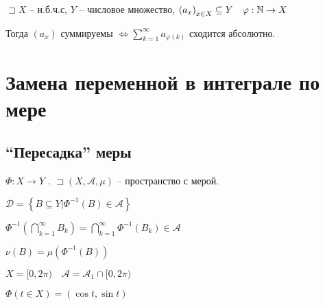 \begin{statement}
    $\sqsupset X$ -- н.б.ч.с, $Y$ -- числовое множество,  $\left( a_x \right) _{x\in X}\subseteq Y\quad \varphi: \mathbb{N}  \to X$

    Тогда $\left( a_x \right) $ суммируемы $\iff \sum_{k=1}^{\infty } a_{\varphi(k)}$ сходится абсолютно.
\end{statement}

\section{Замена переменной в интеграле по мере}

\subsection{``Пересадка'' меры}

$\Phi: X \to Y$ . $\sqsupset \left( X, \mathscr A, \mu \right) $ -- пространство с мерой.

$\mathscr D = \left\{ B\subseteq Y | \Phi^{-1}(B)\in \mathscr A \right\} $

$\Phi^{-1}\left( \bigcap\limits_{k=1}^{\infty }B_k  \right) = \bigcap\limits_{k=1}^{\infty }\Phi^{-1}\left( B_k \right) \in \mathscr A $ 

$\nu\left( B \right)  = \mu\left( \Phi^{-1}\left( B \right)  \right) $ 

\begin{example}
    $X = [0,2\pi )\quad \mathscr A = \mathscr A_1 \cap [0, 2\pi )$

    $\Phi(t\in X) = \left( \cos t, \sin t \right) $
\end{example}

